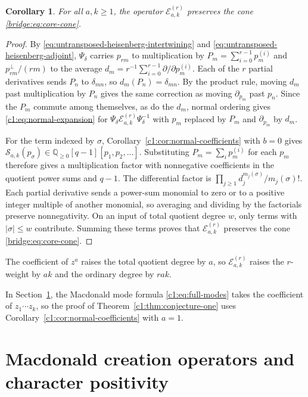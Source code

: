 \documentclass[12pt,reqno,a4paper]{amsart}
\numberwithin{equation}{section}
\numberwithin{figure}{section}
\theoremstyle{plain}
\newtheorem{corollary}[theorem]{Corollary}
\theoremstyle{definition}
\begin{document}
\begin{corollary}\label{bridge:cor:fixed-core}
For all $a,k\geq1$, the operator $\mathscr E^{(r)}_{a,k}$
preserves the cone \eqref{bridge:eq:core-cone}.
\end{corollary}

\begin{proof}
By \eqref{eq:untransposed-heisenberg-intertwining} and
\eqref{eq:untransposed-heisenberg-adjoint}, $\Psi_\delta$ carries
$p_{rm}$ to multiplication by $P_m=\sum_{i=0}^{r-1}p_m^{(i)}$ and
$p_{rm}^{\perp}/(rm)$ to the average
$d_m=r^{-1}\sum_{i=0}^{r-1}\partial/\partial p_m^{(i)}$.
Each of the $r$ partial derivatives sends $P_n$ to $\delta_{mn}$,
so $d_m(P_n)=\delta_{mn}$.  By the product rule, moving $d_m$ past
multiplication by $P_n$ gives the same correction as moving
$\partial_{p_m}$ past $p_n$.  Since the $P_m$ commute among themselves,
as do the $d_m$, normal ordering gives \eqref{c1:eq:normal-expansion}
for $\Psi_\delta\mathscr E^{(r)}_{a,k}\Psi_\delta^{-1}$ with $p_m$
replaced by $P_m$ and $\partial_{p_m}$ by $d_m$.

For the term indexed by $\sigma$, Corollary~\ref{c1:cor:normal-coefficients}
with $b=0$ gives
$\mathcal S_{a,k}(p_\sigma)\in\mathbb Q_{\geq0}[q-1][p_1,p_2,\ldots]$.
Substituting $P_m=\sum_i p_m^{(i)}$ for each $p_m$ therefore gives a
multiplication factor with nonnegative coefficients in the quotient power
sums and $q-1$.  The differential factor is
$\prod_{j\geq1}d_j^{m_j(\sigma)}/m_j(\sigma)!$.  Each partial derivative
sends a power-sum monomial to zero or to a positive integer multiple of
another monomial, so averaging and dividing by the factorials preserve
nonnegativity.  On an input of total quotient degree $w$, only terms
with $|\sigma|\leq w$ contribute.  Summing these terms proves that
$\mathscr E^{(r)}_{a,k}$ preserves the cone \eqref{bridge:eq:core-cone}.
\end{proof}

The coefficient of $z^a$ raises the total quotient degree by $a$,
so $\mathscr E^{(r)}_{a,k}$ raises the $r$-weight by $ak$ and the
ordinary degree by $rak$.

In Section~\ref{sec:c1-positivity}, the Macdonald mode formula
\eqref{c1:eq:full-modes} takes the coefficient of $z_1\cdots z_k$,
so the proof of Theorem~\ref{c1:thm:conjecture-one} uses
Corollary~\ref{c1:cor:normal-coefficients} with $a=1$.


\section{Macdonald creation operators and character positivity}
\label{sec:c1-positivity}
\end{document}
